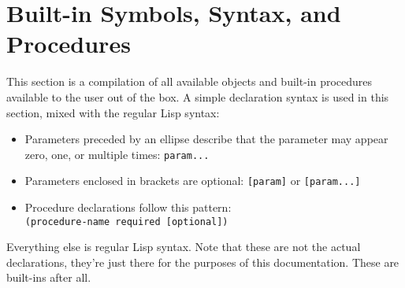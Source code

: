 \documentclass[a4paper]{scrartcl}
\newcommand{\lisp}{Lisp}
\begin{document}
\section{Built-in Symbols, Syntax, and Procedures}
\label{builtins}
	This section is a compilation of all available objects and built-in procedures available to the user out of the box. A simple declaration syntax is used in this section, mixed with the regular \lisp{} syntax:

	\begin{itemize}
		\item Parameters preceded by an ellipse describe that the parameter may appear zero, one, or multiple times: \lstinline|param...|
		\item Parameters enclosed in brackets are optional: \lstinline|[param]| or \lstinline|[param...]|
		\item Procedure declarations follow this pattern:\\
			  \lstinline|(procedure-name required [optional])|
	\end{itemize}

	Everything else is regular \lisp{} syntax. Note that these are not the actual declarations, they're just there for the purposes of this documentation. These are built-ins after all.

	

	
	
	
	
	
	
	
	

	
	
	
	
	
	
	
	
	
	
	
	
	
	
	
	
	
	
\end{document}
